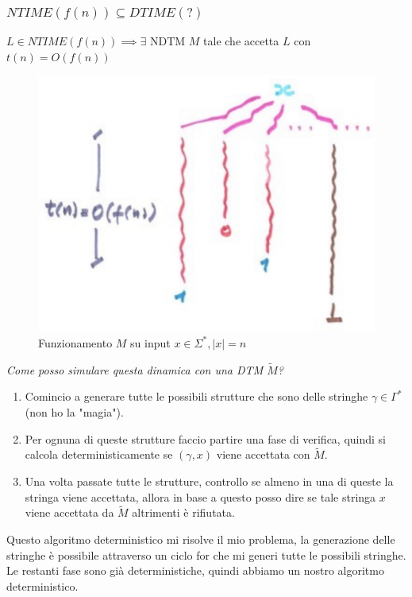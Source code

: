 \documentclass{article}
\begin{document}
\subsubsection{$NTIME(f(n))\subseteq DTIME(?)$}
$L\in NTIME(f(n))\implies\exists\text{ NDTM } M$ tale che accetta $L$ con $t(n)=O(f(n))$
\begin{figure}[H]
    \centering
    \includegraphics[scale=0.6]{images/ndtmfunct.png}
    \caption{Funzionamento $M$ su input $x\in\Sigma^*,|x|=n$}
\end{figure}
\textit{Come posso simulare questa dinamica con una DTM $\tilde{M}$?}
\begin{enumerate}
    \item Comincio a generare tutte le possibili strutture che sono delle stringhe $\gamma\in\Gamma^*$ (non ho
          la "magia").

    \item Per ognuna di queste strutture faccio partire una fase di verifica, quindi si
          calcola deterministicamente se $(\gamma,x)$ viene accettata con $\tilde{M}$.

    \item Una volta passate tutte le strutture, controllo se almeno in una di queste
          la stringa viene accettata, allora in base a questo posso dire se tale stringa $x$ viene accettata
          da $\tilde{M}$ altrimenti è rifiutata.
\end{enumerate}
Questo algoritmo deterministico mi risolve il mio problema, la generazione delle stringhe
è possibile attraverso un ciclo for che mi generi tutte le possibili stringhe. Le restanti
fase sono già deterministiche, quindi abbiamo un nostro algoritmo deterministico.
\end{document}
